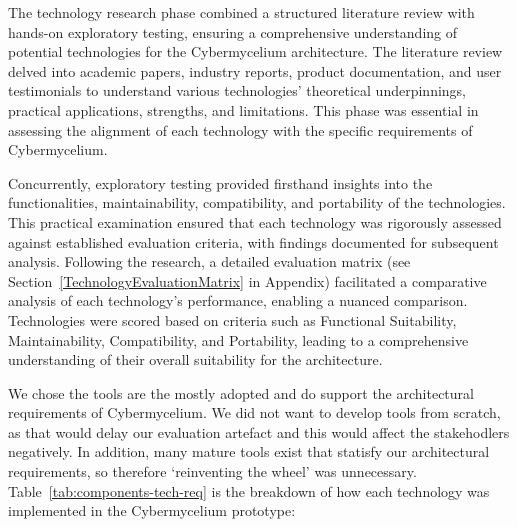 \documentclass[review]{elsarticle}
\begin{document}
The technology research phase combined a structured literature review with hands-on exploratory testing, ensuring a comprehensive understanding of potential technologies for the Cybermycelium architecture. The literature review delved into academic papers, industry reports, product documentation, and user testimonials to understand various technologies' theoretical underpinnings, practical applications, strengths, and limitations. This phase was essential in assessing the alignment of each technology with the specific requirements of Cybermycelium.

Concurrently, exploratory testing provided firsthand insights into the functionalities, maintainability, compatibility, and portability of the technologies. This practical examination ensured that each technology was rigorously assessed against established evaluation criteria, with findings documented for subsequent analysis. Following the research, a detailed evaluation matrix (see Section~\ref{TechnologyEvaluationMatrix} in Appendix) facilitated a comparative analysis of each technology's performance, enabling a nuanced comparison. Technologies were scored based on criteria such as Functional Suitability, Maintainability, Compatibility, and Portability, leading to a comprehensive understanding of their overall suitability for the architecture.

We chose the tools are the mostly adopted and do support the architectural requirements of Cybermycelium. We did not want to develop tools from scratch, as that would delay our evaluation artefact and this would affect the stakehodlers negatively. In addition, many mature tools exist that statisfy our architectural requirements, so therefore `reinventing the wheel' was unnecessary. Table~\ref{tab:components-tech-req} is the breakdown of how each technology was implemented in the Cybermycelium prototype:
\end{document}
